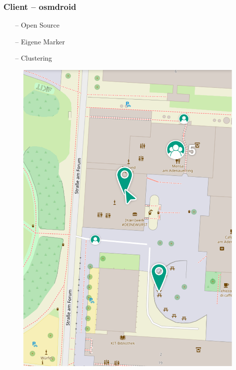 \documentclass[aspectratio=1610]{beamer}
\begin{document}
  \begin{frame}[plain]
      \frametitle{\textbf{Client} -- osmdroid}
	\begin{minipage}{0.45\textwidth}
          \begin{itemize}
              \item[--] Open Source
              \item[--] Eigene Marker
              \item[--] Clustering
          \end{itemize}
      \end{minipage}
      \begin{minipage}{0.5\textwidth}
          \begin{figure}
              \includegraphics[width = \columnwidth - 30pt]{images/gui-mockups/osm_map.png}
          \end{figure}
      \end{minipage}
  \end{frame}
\end{document}

